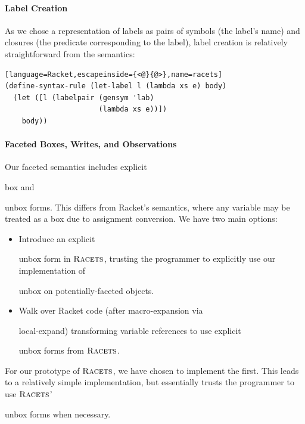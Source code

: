 \documentclass[review=true,acmlarge]{acmart}
\newcommand*{\SavedLstInline}{}
\DeclareRobustCommand*{\lstinline}{%
  \ifmmode
    \let\SavedBGroup\bgroup
    \def\bgroup{%
      \let\bgroup\SavedBGroup
      \hbox\bgroup
    }%
  \fi
  \SavedLstInline
}
\newcommand{\code}[1]{\lstinline{#1}}
\newcommand{\racets}[0]{$\textsc{Racets}$\xspace}
\begin{document}
\paragraph*{Label Creation}

As we chose a representation of labels as pairs of symbols (the
label's name) and closures (the predicate corresponding to the label),
label creation is relatively straightforward from the semantics:

\begin{lstlisting}[language=Racket,escapeinside={<@}{@>},name=racets]
(define-syntax-rule (let-label l (lambda xs e) body)
  (let ([l (labelpair (gensym 'lab)
                      (lambda xs e))])
    body))
\end{lstlisting}

\paragraph*{Faceted Boxes, Writes, and Observations}

Our faceted semantics includes explicit \code{box} and \code{unbox}
forms. This differs from Racket's semantics, where any variable may be
treated as a box due to assignment conversion. We have two main
options:

\begin{itemize}
\item Introduce an explicit \code{unbox} form in \racets, trusting the
  programmer to explicitly use our implementation of \code{unbox} on
  potentially-faceted objects.

\item Walk over Racket code (after macro-expansion via
  \code{local-expand}) transforming variable references to use
  explicit \code{unbox} forms from \racets.
\end{itemize}

For our prototype of \racets, we have chosen to implement the
first. This leads to a relatively simple implementation, but
essentially trusts the programmer to use \racets' \code{unbox} forms
when necessary.
\end{document}
